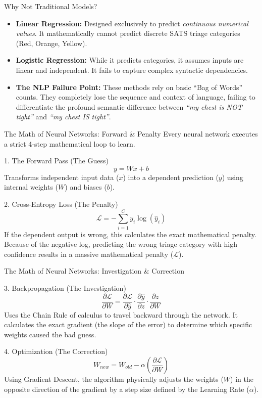 \documentclass[10pt,aspectratio=169]{beamer}
\begin{document}
	\begin{frame}{Why Not Traditional Models?}
		\begin{itemize}
			\item \textbf{Linear Regression:} Designed exclusively to predict \textit{continuous numerical values}. It mathematically cannot predict discrete SATS triage categories (Red, Orange, Yellow).
			\item \textbf{Logistic Regression:} While it predicts categories, it assumes inputs are linear and independent. It fails to capture complex syntactic dependencies.
			\item \textbf{The NLP Failure Point:} These methods rely on basic ``Bag of Words'' counts. They completely lose the sequence and context of language, failing to differentiate the profound semantic difference between \textit{``my chest is NOT tight''} and \textit{``my chest IS tight''}.
		\end{itemize}
	\end{frame}
	
	\begin{frame}{The Math of Neural Networks: Forward \& Penalty}
		Every neural network executes a strict 4-step mathematical loop to learn.
		\vspace{0.3cm}
		\begin{block}{1. The Forward Pass (The Guess)}
			\[ y = Wx + b \]
			Transforms independent input data ($x$) into a dependent prediction ($y$) using internal weights ($W$) and biases ($b$).
		\end{block}
		\vspace{0.1cm}
		\begin{block}{2. Cross-Entropy Loss (The Penalty)}
			\[ \mathcal{L} = -\sum_{i=1}^{C} y_i \log(\hat{y}_i) \]
			If the dependent output is wrong, this calculates the exact mathematical penalty. Because of the negative log, predicting the wrong triage category with high confidence results in a massive mathematical penalty ($\mathcal{L}$).
		\end{block}
	\end{frame}
	
	\begin{frame}{The Math of Neural Networks: Investigation \& Correction}
		\begin{block}{3. Backpropagation (The Investigation)}
			\[ \frac{\partial \mathcal{L}}{\partial W} = \frac{\partial \mathcal{L}}{\partial \hat{y}} \cdot \frac{\partial \hat{y}}{\partial z} \cdot \frac{\partial z}{\partial W} \]
			Uses the Chain Rule of calculus to travel backward through the network. It calculates the exact gradient (the slope of the error) to determine which specific weights caused the bad guess.
		\end{block}
		\vspace{0.1cm}
		\begin{block}{4. Optimization (The Correction)}
			\[ W_{new} = W_{old} - \alpha \left( \frac{\partial \mathcal{L}}{\partial W} \right) \]
			Using Gradient Descent, the algorithm physically adjusts the weights ($W$) in the opposite direction of the gradient by a step size defined by the Learning Rate ($\alpha$).
		\end{block}
	\end{frame}
	
\end{document}
